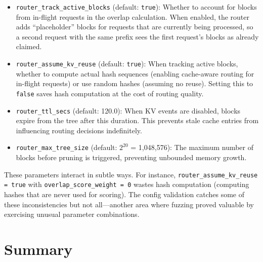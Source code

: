 \begin{itemize}
  \item \texttt{router\_track\_active\_blocks} (default: \texttt{true}): Whether to account for blocks from in-flight requests in the overlap calculation. When enabled, the router adds ``placeholder'' blocks for requests that are currently being processed, so a second request with the same prefix sees the first request's blocks as already claimed.
  \item \texttt{router\_assume\_kv\_reuse} (default: \texttt{true}): When tracking active blocks, whether to compute actual hash sequences (enabling cache-aware routing for in-flight requests) or use random hashes (assuming no reuse). Setting this to \texttt{false} saves hash computation at the cost of routing quality.
  \item \texttt{router\_ttl\_secs} (default: 120.0): When KV events are disabled, blocks expire from the tree after this duration. This prevents stale cache entries from influencing routing decisions indefinitely.
  \item \texttt{router\_max\_tree\_size} (default: $2^{20}$ = 1,048,576): The maximum number of blocks before pruning is triggered, preventing unbounded memory growth.
\end{itemize}

These parameters interact in subtle ways. For instance, \texttt{router\_assume\_kv\_reuse = true} with \texttt{overlap\_score\_weight = 0} wastes hash computation (computing hashes that are never used for scoring). The config validation catches some of these inconsistencies but not all---another area where fuzzing proved valuable by exercising unusual parameter combinations.

\section{Summary}

